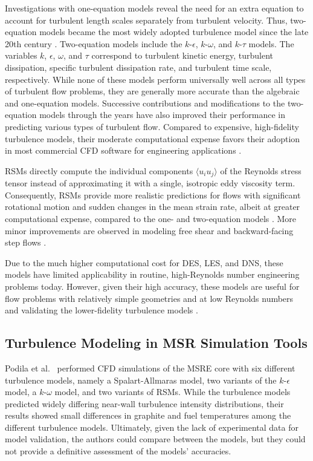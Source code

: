Investigations with
one-equation models reveal the need for an extra equation to account for
turbulent length scales separately from turbulent velocity. Thus, two-equation
models became the most widely adopted turbulence model since the late 20th century
\cite{pope_turbulent_2000}. Two-equation models include the $k$-$\epsilon$,
$k$-$\omega$, and $k$-$\tau$ models. The variables $k$, $\epsilon$, $\omega$,
and $\tau$ correspond to turbulent kinetic energy, turbulent dissipation,
specific turbulent dissipation rate, and turbulent time scale, respectively.
While none of these models perform universally well across all types of
turbulent flow problems, they are generally more
accurate than the algebraic and one-equation models. Successive contributions
and modifications to the two-equation models through the years have also
improved their performance in predicting various types of turbulent flow. Compared to expensive,
high-fidelity turbulence models, their moderate computational expense favors their adoption in most
commercial \gls{CFD} software for engineering applications \cite{pope_turbulent_2000}.

\glspl{RSM} directly compute the individual components $\langle u_i u_j
\rangle$ of the Reynolds stress tensor instead of approximating it with a
single, isotropic eddy viscosity term. Consequently, \glspl{RSM} provide
more realistic predictions for flows with significant rotational motion and
sudden changes in the mean strain rate, albeit at greater computational
expense, compared to the one- and two-equation models
\cite{wilcox_turbulence_2006}. More minor improvements are observed in modeling
free shear and backward-facing step flows \cite{wilcox_turbulence_2006}.

Due to the much higher computational cost for \gls{DES}, \gls{LES}, and
\gls{DNS}, these models have limited applicability in routine, high-Reynolds
number engineering problems today. However, given their high accuracy, these
models are useful for flow problems with relatively simple geometries and at
low Reynolds numbers and validating the lower-fidelity turbulence models
\cite{zhiyin_large-eddy_2015}.

\subsection{Turbulence Modeling in MSR Simulation Tools}

Podila et al.\ \cite{podila_cfd_2019} performed \gls{CFD} simulations of the
\gls{MSRE} core with six different turbulence models, namely a Spalart-Allmaras
model, two variants of the $k$-$\epsilon$ model, a $k$-$\omega$ model, and two
variants of \glspl{RSM}. While the turbulence models predicted widely differing near-wall
turbulence intensity distributions, their results showed small differences
in graphite and fuel temperatures among the different turbulence models. Ultimately, given
the lack of experimental data for model validation, the authors could compare between the
models, but they could not provide a definitive
assessment of the models' accuracies.

